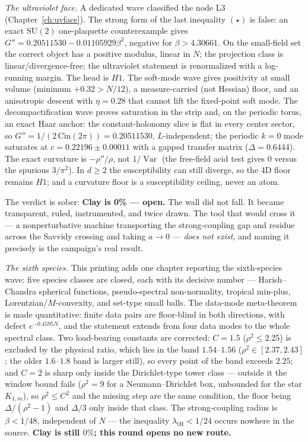 \documentclass[11pt,a4paper]{article}
\begin{document}
\begin{tcolorbox}[enhanced, breakable, colback=white, colframe=white, boxrule=0pt,
  left=6pt, right=6pt, top=4pt, bottom=4pt, parbox=false]
\emph{The ultraviolet face.} A dedicated wave classified the node L3 (Chapter~\ref{ch:uvface}). The
strong form of the last inequality $(\star)$ is false: an exact $\mathrm{SU}(2)$ one-plaquette
counterexample gives $G''=0.20511530-0.01105929\beta^2$, negative for $\beta>4.30661$. On the
small-field set the correct object has a positive modulus, linear in $N$; the projection class is
linear/divergence-free; the ultraviolet statement is renormalized with a log-running margin. The
head is $H1$. The soft-mode wave gives positivity at small volume (minimum $+0.32>N/12$), a
measure-carried (not Hessian) floor, and an anisotropic descent with $\eta=0.28$ that cannot lift the
fixed-point soft mode. The decompactification wave proves saturation in the strip and, on the periodic
torus, an exact Haar anchor: the constant-holonomy slice is flat in every center sector, so
$G''=1/(2\,\mathrm{Cin}(2\pi))=0.20511530$, $L$-independent; the periodic $k=0$ mode saturates at
$c=0.22196\pm0.00011$ with a gapped transfer matrix ($\Delta=0.6444$). The exact curvature is
$-\rho''/\rho$, not $1/\operatorname{Var}$ (the free-field acid test gives $0$ versus the spurious
$3/\pi^2$). In $d\ge2$ the susceptibility can still diverge, so the 4D floor remains $H1$; and a
curvature floor is a susceptibility ceiling, never an atom.

The verdict is sober: \textbf{Clay is 0\% --- open.} The wall did not fall. It became transparent,
ruled, instrumented, and twice drawn. The tool that would cross it --- a nonperturbative machine
transporting the strong-coupling gap and residue across the Savvidy crossing and taking $a\to0$
--- \emph{does not exist}, and naming it precisely is the campaign's real result.

\emph{The sixth species.} This printing adds one chapter reporting the sixth-species wave: five
species classes are closed, each with its decisive number --- Harish--Chandra spherical functions,
pseudo-spectral non-normality, tropical min-plus, Lorentzian/$M$-convexity, and set-type small
balls. The data-mode meta-theorem is made quantitative: finite data pairs are floor-blind in both
directions, with defect $e^{-0.4595N}$, and the statement extends from four data modes to the whole
spectral class. Two load-bearing constants are corrected: $C=1.5$ ($\rho^2\le2.25$) is excluded by
the physical ratio, which lies in the band $1.54$--$1.56$ ($\rho^2\in[2.37,2.43]$; the older
$1.6$--$1.8$ band is larger still), so every point of the band exceeds $2.25$; and $C=2$ is sharp
only inside the Dirichlet-type tower class --- outside it the window bound fails ($\rho^2=9$ for a
Neumann--Dirichlet box, unbounded for the star $K_{1,m}$), so $\rho^2\le C^2$ and the missing step
are the same condition, the floor being
$\Delta/(\rho^2-1)$ and $\Delta/3$ only inside that class. The strong-coupling radius is
$\beta<1/48$, independent of $N$ --- the inequality $\lambda_{\mathrm{tH}}<1/24$ occurs nowhere in
the source. \textbf{Clay is still $0\%$; this round opens no new route.}
\end{tcolorbox}
\end{document}
